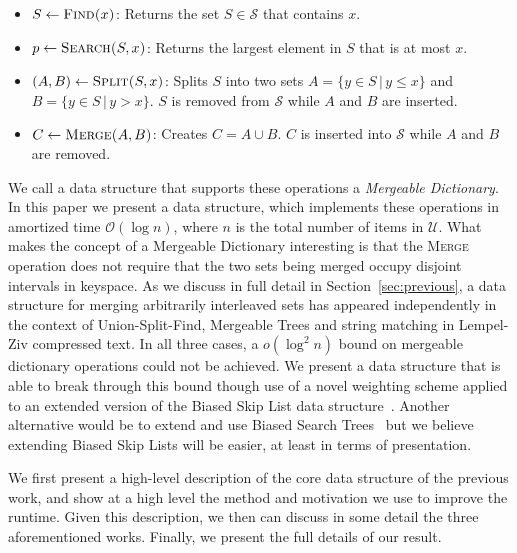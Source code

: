 \documentclass[11pt]{article}
\newcommand{\Ds}{Mergeable Dictionary}
\newcommand{\kwSpl}{Split}
\newcommand{\kwUnion}{Merge}
\newcommand{\kwSrc}{Search}
\newcommand{\kwFind}{Find}
\newcommand{\Splx}[2]{\mbox{\textsc{\kwSpl(\ensuremath{#1,#2})}}}
\newcommand{\Union}{\mbox{\textsc{\kwUnion{}}}}
\newcommand{\Unionx}[2]{\mbox{\textsc{\kwUnion(\ensuremath{#1,#2})}}}
\newcommand{\Srcx}[2]{\mbox{\textsc{\kwSrc(\ensuremath{#1,#2})}}}
\newcommand{\Findx}[1]{\mbox{\textsc{\kwFind(\ensuremath{#1})}}}
\newcommand{\opcount}{4}
\newcommand{\universe}{\ensuremath{\mathcal U}}
\newcommand{\set}[1]{\ensuremath{#1}}
\newcommand{\collection}[1]{\ensuremath{\mathcal #1}}
\newcommand{\hide}[1]{}
\newcounter{count}
\begin{document}
\begin{itemize} 

\item $S\leftarrow \Findx{x}$: Returns the set $\set S \in \collection S$ that contains $x$. 

\item $p\leftarrow \Srcx{S}{x}$: Returns the largest element in \set S that is at most $x$. 

\item $(\set A,\set B)\leftarrow \Splx{S}{x}$: Splits \set S into two sets $\set A = \{y\in\set S\,|\,y\leq x\}$ and $\set B = \{y\in\set S\,|\,y> x\}$. \set S is removed from \collection S while \set A and \set B are inserted. 

\item $C\leftarrow \Unionx{A}{B}$: Creates $\set C = \set A \cup \set B$. \set C is inserted into \collection S while \set A and \set B are removed. 

\end{itemize} 

We call a data structure that supports these\hide{ \opcount{}} operations a \emph{\Ds{}}. In this paper we present a data structure, which implements these operations in amortized time $\mathcal O(\log n)$, where $n$ is the total number of items in \universe{}. What makes the concept of a \Ds{} interesting is that the \Union{} operation does not require that the two sets being merged occupy disjoint intervals in keyspace. As we discuss in full detail in Section~\ref{sec:previous}, a data structure for merging arbitrarily interleaved sets has appeared independently in the context of Union-Split-Find, Mergeable Trees and string matching in Lempel-Ziv compressed text. In all three cases, a $o(\log^2 n)$ bound on mergeable dictionary operations could not be achieved. We present a data structure that is able to break through this bound though use of a novel weighting scheme applied to an extended version of the Biased Skip List data structure~\cite{journals/algorithmica/BagchiBG05}. Another alternative would be to extend and use Biased Search Trees~\cite{journals/siamcomp/BentST85} but we believe extending Biased Skip Lists will be easier, at least in terms of presentation.

We first present a high-level description of the core data structure of the previous work, and show at a high level the method and motivation we use to improve the runtime. Given this description, we then can discuss in some detail the three aforementioned works. Finally, we present the full details of our result. 
\end{document}
